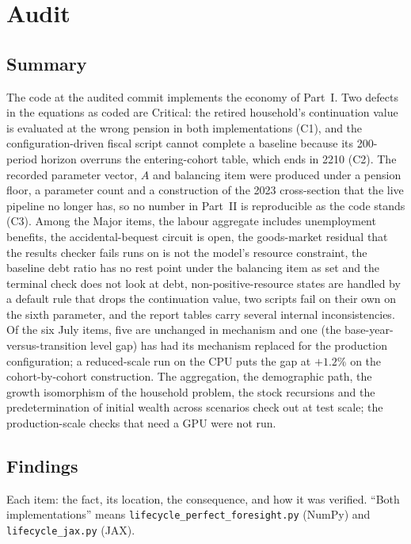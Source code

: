 \documentclass[11pt,a4paper]{article}
\newcommand{\code}[1]{\texttt{#1}}
\begin{document}
\section{Audit}

\subsection{Summary}

The code at the audited commit implements the economy of Part~I. Two defects in the equations as coded are Critical: the retired household's continuation value is evaluated at the wrong pension in both implementations (C1), and the configuration-driven fiscal script cannot complete a baseline because its 200-period horizon overruns the entering-cohort table, which ends in 2210 (C2). The recorded parameter vector, $A$ and balancing item were produced under a pension floor, a parameter count and a construction of the 2023 cross-section that the live pipeline no longer has, so no number in Part~II is reproducible as the code stands (C3). Among the Major items, the labour aggregate includes unemployment benefits, the accidental-bequest circuit is open, the goods-market residual that the results checker fails runs on is not the model's resource constraint, the baseline debt ratio has no rest point under the balancing item as set and the terminal check does not look at debt, non-positive-resource states are handled by a default rule that drops the continuation value, two scripts fail on their own on the sixth parameter, and the report tables carry several internal inconsistencies. Of the six July items, five are unchanged in mechanism and one (the base-year-versus-transition level gap) has had its mechanism replaced for the production configuration; a reduced-scale run on the CPU puts the gap at $+1.2\%$ on the cohort-by-cohort construction. The aggregation, the demographic path, the growth isomorphism of the household problem, the stock recursions and the predetermination of initial wealth across scenarios check out at test scale; the production-scale checks that need a GPU were not run.

\subsection{Findings}

Each item: the fact, its location, the consequence, and how it was verified. ``Both implementations'' means \code{lifecycle_perfect_foresight.py} (NumPy) and \code{lifecycle_jax.py} (JAX).
\end{document}
